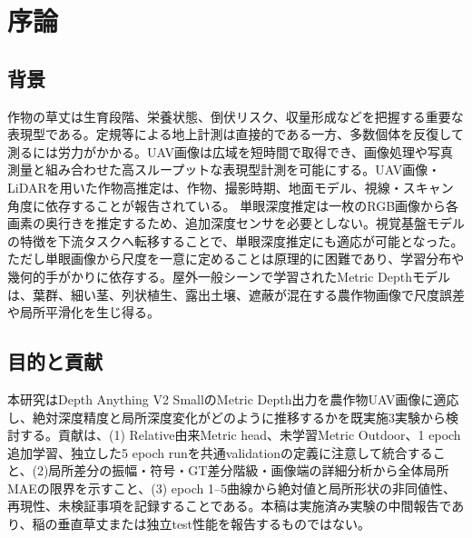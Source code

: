 \chapter{序論}
\section{背景}
作物の草丈は生育段階、栄養状態、倒伏リスク、収量形成などを把握する重要な表現型である。定規等による地上計測は直接的である一方、多数個体を反復して測るには労力がかかる。UAV画像は広域を短時間で取得でき、画像処理や写真測量と組み合わせた高スループットな表現型計測を可能にする。UAV画像・LiDARを用いた作物高推定は、作物、撮影時期、地面モデル、視線・スキャン角度に依存することが報告されている\cite{cropheight,uav3dcrop}。
単眼深度推定は一枚のRGB画像から各画素の奥行きを推定するため、追加深度センサを必要としない。視覚基盤モデルの特徴を下流タスクへ転移することで、単眼深度推定にも適応が可能となった\cite{dinov2,dav2}。ただし単眼画像から尺度を一意に定めることは原理的に困難であり、学習分布や幾何的手がかりに依存する\cite{eigen2014}。屋外一般シーンで学習されたMetric Depthモデルは、葉群、細い茎、列状植生、露出土壌、遮蔽が混在する農作物画像で尺度誤差や局所平滑化を生じ得る。
\section{目的と貢献}
本研究はDepth Anything V2 SmallのMetric Depth出力を農作物UAV画像に適応し、絶対深度精度と局所深度変化がどのように推移するかを既実施3実験から検討する。貢献は、(1) Relative由来Metric head、未学習Metric Outdoor、1 epoch追加学習、独立した5 epoch runを共通validationの定義に注意して統合すること、(2)局所差分の振幅・符号・GT差分階級・画像端の詳細分析から全体局所MAEの限界を示すこと、(3) epoch 1--5曲線から絶対値と局所形状の非同値性、再現性、未検証事項を記録することである。本稿は実施済み実験の中間報告であり、稲の垂直草丈または独立test性能を報告するものではない。